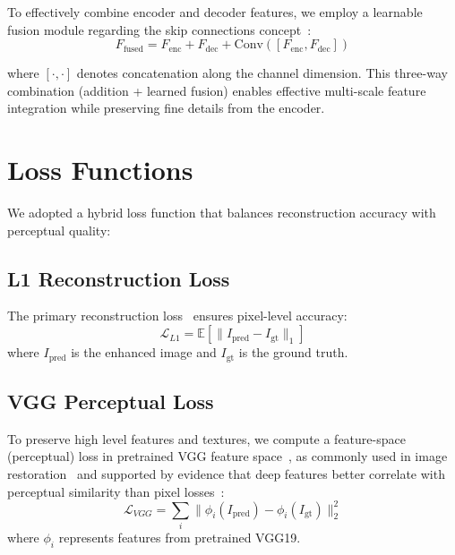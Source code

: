 \documentclass[conference]{IEEEtran}
\begin{document}
To effectively combine encoder and decoder features, we employ a learnable fusion module regarding the skip connections concept~\cite{ronneberger2015unet}:
\begin{equation}
F_{\text{fused}} = F_{\text{enc}} + F_{\text{dec}} + \text{Conv}([F_{\text{enc}}, F_{\text{dec}}])
\end{equation}

where $[\cdot, \cdot]$ denotes concatenation along the channel dimension. This three-way combination (addition + learned fusion) enables effective multi-scale feature integration while preserving fine details from the encoder.

\section{Loss Functions}

We adopted a hybrid loss function that balances reconstruction accuracy with perceptual quality:

\subsection{L1 Reconstruction Loss}
The primary reconstruction loss~\cite{isola2016pix2pix} ensures pixel-level accuracy:
\begin{equation}
\mathcal{L}_{L1} = \mathbb{E}[\|I_{\text{pred}} - I_{\text{gt}}\|_1]
\end{equation}
where $I_{\text{pred}}$ is the enhanced image and $I_{\text{gt}}$ is the ground truth.

\subsection{VGG Perceptual Loss}
To preserve high level features and textures, we compute a feature-space (perceptual) loss in pretrained VGG feature space~\cite{simonyan2014vgg}, as commonly used in image restoration~\cite{ledig2016srgan} and supported by evidence that deep features better correlate with perceptual similarity than pixel losses~\cite{zhang2018lpips}:
\begin{equation}
\mathcal{L}_{VGG} = \sum_{i} \|\phi_i(I_{\text{pred}}) - \phi_i(I_{\text{gt}})\|_2^2
\end{equation}
where $\phi_i$ represents features from pretrained VGG19.
\end{document}
